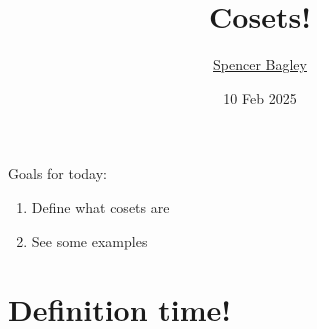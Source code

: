 \documentclass[8pt, handout]{beamer}
\title[Cosets!]{Cosets!}
\author[\href{mailto:sbagley@westminsteru.edu}{S. Bagley}]
       {\href{mailto:sbagley@westminsteru.edu}{Spencer Bagley}}
\institute[Westminster] { 
  \normalsize With many thanks to Matthew Macauley, \\
  \url{http://www.math.clemson.edu/~macaule/}}
\date[10 Feb 2025]{10 Feb 2025}
\newcommand{\Pause}{\pause}      %
\begin{document}
\frame{\titlepage}


\begin{frame}{Goals for today:}
  \begin{enumerate}
    \item Define what cosets are \Pause
    \item See some examples
  \end{enumerate}
\end{frame}


\section{Definition time!}
\end{document}
